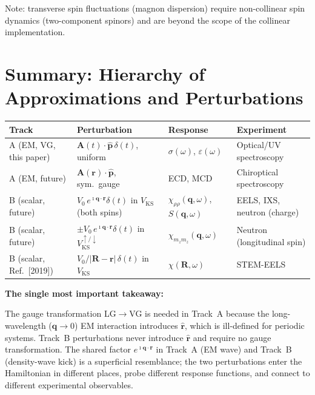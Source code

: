 \documentclass[11pt]{article}
\newcommand{\iunit}{\imath}
\newcommand{\Avec}{\mathbf{A}}
\newcommand{\phat}{\hat{\mathbf{p}}}
\newcommand{\rhat}{\hat{\mathbf{r}}}
\newcommand{\VKS}{V_{\mathrm{KS}}}
\begin{document}
Note: transverse spin fluctuations (magnon dispersion) require
non-collinear spin dynamics (two-component spinors) and are beyond
the scope of the collinear implementation.

\section{Summary: Hierarchy of Approximations and Perturbations}

\begin{center}
\begin{tabular}{p{2.0cm}p{4.2cm}p{3.0cm}p{3.2cm}}
\toprule
\textbf{Track} & \textbf{Perturbation} & \textbf{Response}
  & \textbf{Experiment} \\
\midrule
A (EM, VG, this paper)
  & $\Avec(t)\cdot\phat\,\delta(t)$, uniform
  & $\sigma(\omega)$, $\varepsilon(\omega)$
  & Optical/UV spectroscopy \\
\midrule
A (EM, future)
  & $\Avec(\mathbf{r})\cdot\phat$, sym.\ gauge
  & ECD, MCD
  & Chiroptical spectroscopy \\
\midrule
B (scalar, future)
  & $V_0\,e^{\iunit\mathbf{q}\cdot\mathbf{r}}\delta(t)$
    in $\VKS$ (both spins)
  & $\chi_{\rho\rho}(\mathbf{q},\omega)$, $S(\mathbf{q},\omega)$
  & EELS, IXS, neutron (charge) \\
\midrule
B (scalar, future)
  & $\pm V_0\,e^{\iunit\mathbf{q}\cdot\mathbf{r}}\delta(t)$
    in $\VKS^{\uparrow/\downarrow}$
  & $\chi_{m_z m_z}(\mathbf{q},\omega)$
  & Neutron (longitudinal spin) \\
\midrule
B (scalar, Ref.\ [2019])
  & $V_0/|\mathbf{R}-\mathbf{r}|\,\delta(t)$
    in $\VKS$
  & $\chi(\mathbf{R},\omega)$
  & STEM-EELS \\
\bottomrule
\end{tabular}
\end{center}

\bigskip
\noindent\textbf{The single most important takeaway:}

\begin{keyresult}
The gauge transformation LG$\to$VG is needed in Track~A because
the long-wavelength ($\mathbf{q}\to0$) EM interaction introduces
$\rhat$, which is ill-defined for periodic systems.
Track~B perturbations never introduce $\rhat$ and require no gauge
transformation.
The shared factor $e^{\iunit\mathbf{q}\cdot\mathbf{r}}$ in Track~A
(EM wave) and Track~B (density-wave kick) is a superficial
resemblance; the two perturbations enter the Hamiltonian in
different places, probe different response functions, and connect
to different experimental observables.
\end{keyresult}
\end{document}
